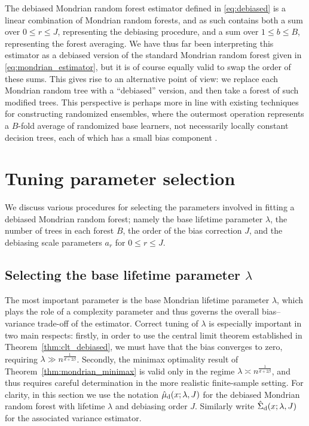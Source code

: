 The debiased Mondrian random forest estimator defined in \eqref{eq:debiased}
is a linear combination of Mondrian random forests,
and as such contains both a sum over $0 \leq r \leq J$,
representing the debiasing procedure,
and a sum over $1 \leq b \leq B$, representing the forest averaging.
We have thus far been interpreting this estimator as a debiased
version of the standard Mondrian random forest given in
\eqref{eq:mondrian_estimator},
but it is of course equally valid to swap the order of these sums.
This gives rise to an alternative point of view:
we replace each Mondrian random tree with a ``debiased'' version,
and then take a forest of such modified trees.
This perspective is perhaps more in line with existing
techniques for constructing
randomized ensembles, where the outermost operation
represents a $B$-fold average
of randomized base learners, not necessarily locally constant decision trees,
each of which has a small bias component
\citep{caruana2004ensemble, zhou2019deep, friedberg2020local}.

\section{Tuning parameter selection}%
\label{sec:parameter_selection}

We discuss various procedures for selecting the parameters
involved in fitting a debiased Mondrian random forest;
namely the base lifetime parameter $\lambda$,
the number of trees in each forest $B$,
the order of the bias correction $J$,
and the debiasing scale parameters $a_r$ for $0 \leq r \leq J$.

\subsection{Selecting the base lifetime parameter
\texorpdfstring{$\lambda$}{lambda}}%

The most important parameter is the base Mondrian lifetime parameter $\lambda$,
which plays the role of a complexity parameter and thus governs the overall
bias--variance trade-off of the estimator.
Correct tuning of $\lambda$ is especially important in two main respects:
%
firstly, in order to use the central limit theorem established in
Theorem~\ref{thm:clt_debiased}, we must have that the bias converges to zero,
requiring $\lambda \gg n^{\frac{1}{d + 2\beta}}$.
%
Secondly, the minimax optimality result of Theorem~\ref{thm:mondrian_minimax}
is valid
only in the regime $\lambda \asymp n^{\frac{1}{d + 2\beta}}$,
and thus requires careful determination
in the more realistic finite-sample setting.
For clarity, in this section we use the notation
$\hat\mu_{\mathrm{d}}(x; \lambda, J)$ for the debiased Mondrian random forest
with lifetime $\lambda$ and debiasing order $J$.
Similarly write $\hat\Sigma_{\mathrm{d}}(x; \lambda, J)$ for the
associated variance estimator.

